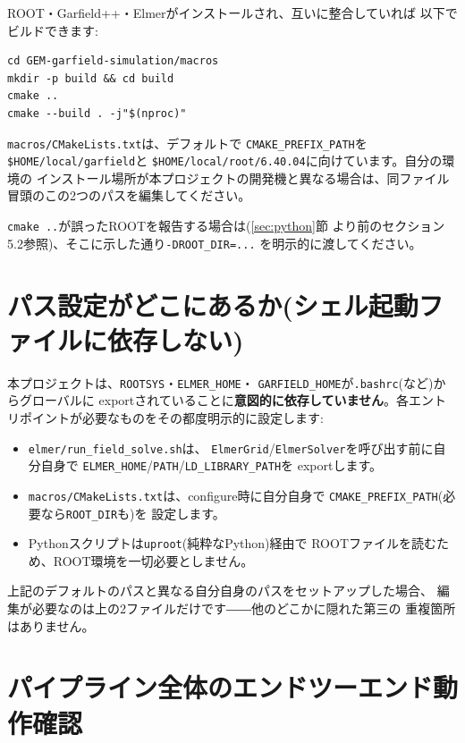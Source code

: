 \documentclass[11pt]{ltjsarticle}
\begin{document}
ROOT・Garfield++・Elmerがインストールされ、互いに整合していれば
以下でビルドできます:

\begin{lstlisting}
cd GEM-garfield-simulation/macros
mkdir -p build && cd build
cmake ..
cmake --build . -j"$(nproc)"
\end{lstlisting}

\texttt{macros/CMakeLists.txt}は、デフォルトで
\texttt{CMAKE\_PREFIX\_PATH}を\texttt{\$HOME/local/garfield}と
\texttt{\$HOME/local/root/6.40.04}に向けています。自分の環境の
インストール場所が本プロジェクトの開発機と異なる場合は、同ファイル
冒頭のこの2つのパスを編集してください。

\texttt{cmake ..}が誤ったROOTを報告する場合は(\ref{sec:python}節
より前のセクション5.2参照)、そこに示した通り\texttt{-DROOT\_DIR=...}
を明示的に渡してください。

\section{パス設定がどこにあるか(シェル起動ファイルに依存しない)}
\label{sec:paths}

本プロジェクトは、\texttt{ROOTSYS}・\texttt{ELMER\_HOME}・
\texttt{GARFIELD\_HOME}が\texttt{.bashrc}(など)からグローバルに
exportされていることに\textbf{意図的に依存していません}。各エント
リポイントが必要なものをその都度明示的に設定します:

\begin{itemize}
  \item \texttt{elmer/run\_field\_solve.sh}は、
    \texttt{ElmerGrid}/\texttt{ElmerSolver}を呼び出す前に自分自身で
    \texttt{ELMER\_HOME}/\texttt{PATH}/\texttt{LD\_LIBRARY\_PATH}を
    exportします。
  \item \texttt{macros/CMakeLists.txt}は、configure時に自分自身で
    \texttt{CMAKE\_PREFIX\_PATH}(必要なら\texttt{ROOT\_DIR}も)を
    設定します。
  \item Pythonスクリプトは\texttt{uproot}(純粋なPython)経由で
    ROOTファイルを読むため、ROOT環境を一切必要としません。
\end{itemize}

上記のデフォルトのパスと異なる自分自身のパスをセットアップした場合、
編集が必要なのは上の2ファイルだけです――他のどこかに隠れた第三の
重複箇所はありません。

\section{パイプライン全体のエンドツーエンド動作確認}
\end{document}
